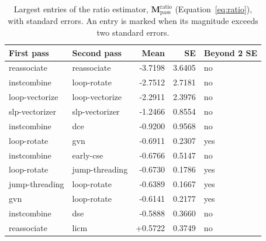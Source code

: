 \begin{table}[t]
\centering
\caption{Largest entries of the ratio estimator, $\mathbf{M}^{\mathrm{ratio}}_{\mathrm{pass}}$ (Equation~\ref{eq:ratio}), with standard errors. An entry is marked when its magnitude exceeds two standard errors.}
\label{tab:mpass}
\setlength{\tabcolsep}{3pt}
\begin{tabular}{|l|l|r|r|l|}
\hline
First pass & Second pass & Mean & SE & Beyond 2 SE \\
\hline
reassociate & reassociate & -3.7198 & 3.6405 & no \\
\hline
instcombine & loop-rotate & -2.7512 & 2.7181 & no \\
\hline
loop-vectorize & loop-vectorize & -2.2911 & 2.3976 & no \\
\hline
slp-vectorizer & slp-vectorizer & -1.2466 & 0.8554 & no \\
\hline
instcombine & dce & -0.9200 & 0.9568 & no \\
\hline
loop-rotate & gvn & -0.6911 & 0.2307 & yes \\
\hline
instcombine & early-cse & -0.6766 & 0.5147 & no \\
\hline
loop-rotate & jump-threading & -0.6730 & 0.1786 & yes \\
\hline
jump-threading & loop-rotate & -0.6389 & 0.1667 & yes \\
\hline
gvn & loop-rotate & -0.6141 & 0.2177 & yes \\
\hline
instcombine & dse & -0.5888 & 0.3660 & no \\
\hline
reassociate & licm & +0.5722 & 0.3749 & no \\
\hline
\end{tabular}
\end{table}
